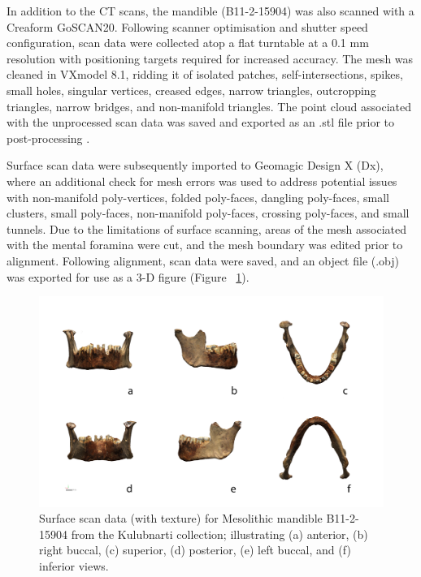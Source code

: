 \documentclass[review]{elsarticle}
\begin{document}
In addition to the CT scans, the mandible (B11-2-15904) was also scanned with a Creaform GoSCAN20. Following scanner optimisation and shutter speed configuration, scan data were collected atop a flat turntable at a 0.1 mm resolution with positioning targets required for increased accuracy. The mesh was cleaned in VXmodel 8.1, ridding it of isolated patches, self-intersections, spikes, small holes, singular vertices, creased edges, narrow triangles, outcropping triangles, narrow bridges, and non-manifold triangles. The point cloud associated with the unprocessed scan data was saved and exported as an .stl file prior to post-processing \citep{RN5585}. 

Surface scan data \citep{RN5931,RN5924} were subsequently imported to Geomagic Design X (Dx), where an additional check for mesh errors was used to address potential issues with non-manifold poly-vertices, folded poly-faces, dangling poly-faces, small clusters, small poly-faces, non-manifold poly-faces, crossing poly-faces, and small tunnels. Due to the limitations of surface scanning, areas of the mesh associated with the mental foramina were cut, and the mesh boundary was edited prior to alignment. Following alignment, scan data were saved, and an object file (.obj) was exported for use as a 3-D figure (Figure ~\ref{fig:Fig2}).

\begin{figure}[ht]\centering
\includegraphics[width=\linewidth]{Fig1}
\caption{Surface scan data (with texture) for Mesolithic mandible B11-2-15904 from the Kulubnarti collection; illustrating (a) anterior, (b) right buccal, (c) superior, (d) posterior, (e) left buccal, and (f) inferior views.}
\label{fig:Fig2}
\end{figure}
\end{document}
